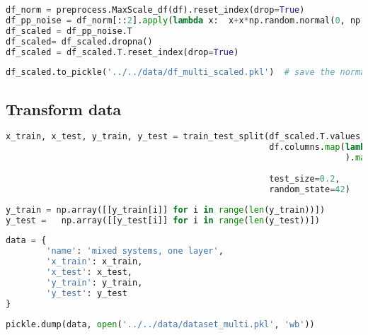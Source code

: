 \begin{lstlisting}[language=Python]
df_norm = preprocess.MaxScale_df(df).reset_index(drop=True)                                                    # each spectrum is scaled to 1
df_pp_noise = df_norm[::2].apply(lambda x:  x+x*np.random.normal(0, np.random.randint(1,3)*0.01 , len(x)))     # reduce size to 1024 and add noise
df_scaled = df_pp_noise.T
df_scaled= df_scaled.dropna()
df_scaled = df_scaled.T.reset_index(drop=True)
\end{lstlisting}

\begin{lstlisting}[language=Python]
df_scaled.to_pickle('../../data/df_multi_scaled.pkl')  # save the normalized, scaled df
\end{lstlisting}

\hypertarget{transform-data}{%
\subsection{Transform data}\label{transform-data}}

\begin{lstlisting}[language=Python]
x_train, x_test, y_train, y_test = train_test_split(df_scaled.T.values,
                                                    df.columns.map(lambda x: x.split('_')[:-1]
                                                                   ).map(base.pair_list_to_tuples
                                                                         ).map(base.one_hot_encode_concentrations),
                                                    test_size=0.2,
                                                    random_state=42)
\end{lstlisting}

\begin{lstlisting}[language=Python]
y_train = np.array([[y_train[i]] for i in range(len(y_train))])
y_test =   np.array([[y_test[i]] for i in range(len(y_test))])
\end{lstlisting}

\begin{lstlisting}[language=Python]
data = {
        'name': 'mixed systems, one layer',
        'x_train': x_train,
        'x_test': x_test,
        'y_train': y_train,
        'y_test': y_test
}
\end{lstlisting}

\begin{lstlisting}[language=Python]
pickle.dump(data, open('../../data/dataset_multi.pkl', 'wb'))
\end{lstlisting}


